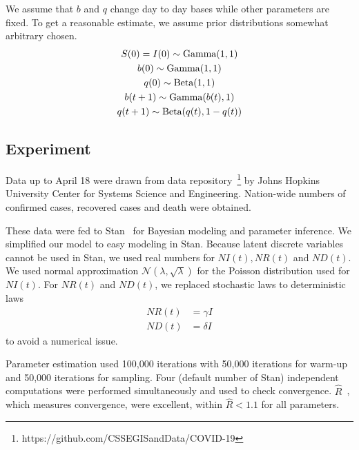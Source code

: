 \documentclass{article}
\begin{document}
We assume that $b$ and $q$ change day to day bases while other parameters are fixed.
To get a reasonable estimate, we assume prior distributions somewhat arbitrary chosen.
\begin{gather}
 S(0) = I(0) \sim \textup{Gamma}(1, 1)\\
 b(0) \sim \textup{Gamma}(1, 1)\\
 q(0) \sim \textup{Beta}(1, 1)\\
 b(t+1) \sim \textup{Gamma}(b(t), 1)\\
 q(t+1) \sim \textup{Beta}(q(t), 1-q(t))
\end{gather}



\subsection{Experiment}

Data up to April 18 were drawn from data repository~\footnote{https://github.com/CSSEGISandData/COVID-19} by Johns Hopkins University Center for Systems Science and Engineering.
Nation-wide numbers of confirmed cases, recovered cases and death were obtained.

These data were fed to Stan~\cite{carpenter2017stan} for Bayesian modeling and parameter inference.
We simplified our model to easy modeling in Stan.
Because latent discrete variables cannot be used in Stan, we used real numbers for $NI(t), NR(t)$ and $ND(t)$.
We used normal approximation $\mathcal{N}(\lambda, \sqrt{\lambda})$ for the Poisson distribution used for $NI(t)$.
For $NR(t)$ and $ND(t)$, we replaced stochastic laws to deterministic laws
\begin{align}
 NR(t) &= \gamma I\\
 ND(t) &= \delta I
\end{align}
to avoid a numerical issue.

Parameter estimation used 100,000 iterations with 50,000 iterations for warm-up and 50,000 iterations for sampling.
Four (default number of Stan) independent computations were performed simultaneously and used to check convergence.
$\hat{R}$~\cite{vehtari2019rank}, which measures convergence, were excellent, within $\hat{R} < 1.1$ for all parameters. 
\end{document}
